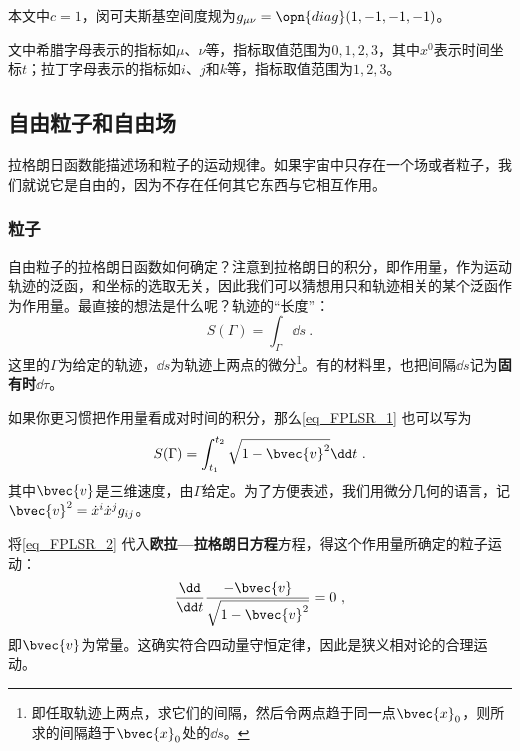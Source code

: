 

本文中$c=1$，闵可夫斯基空间度规为$g_{\mu\nu} = \opn{diag}(1, -1, -1, -1)$。

文中希腊字母表示的指标如$\mu$、$\nu$等，指标取值范围为$0, 1, 2, 3$，其中$x^0$表示时间坐标$t$；拉丁字母表示的指标如$i$、$j$和$k$等，指标取值范围为$1, 2, 3$。

\subsection{自由粒子和自由场}

拉格朗日函数能描述场和粒子的运动规律。如果宇宙中只存在一个场或者粒子，我们就说它是自由的，因为不存在任何其它东西与它相互作用。

\subsubsection{粒子}

自由粒子的拉格朗日函数如何确定？注意到拉格朗日的积分，即作用量，作为运动轨迹的泛函，和坐标的选取无关，因此我们可以猜想用只和轨迹相关的某个泛函作为作用量。最直接的想法是什么呢？轨迹的“长度”：
\begin{equation}\label{eq_FPLSR_1}
S(\Gamma) = \int_\Gamma \dd s~.
\end{equation}
这里的$\Gamma$为给定的轨迹，$\dd s$为轨迹上两点的微分\footnote{即任取轨迹上两点，求它们的间隔，然后令两点趋于同一点$\bvec{x}_0$，则所求的间隔趋于$\bvec{x}_0$处的$\dd s$。}。有的材料里，也把间隔$\dd s$记为\textbf{固有时}$\dd \tau$。

如果你更习惯把作用量看成对时间的积分，那么\autoref{eq_FPLSR_1} 也可以写为
\begin{equation}\label{eq_FPLSR_2}
S(\Gamma) = \int_{t_1}^{t_2} \sqrt{1-\bvec{v}^2} \dd t~.
\end{equation}
其中$\bvec{v}$是三维速度，由$\Gamma$给定。为了方便表述，我们用微分几何的语言，记$\bvec{v}^2=\dot{x}^i\dot{x}^jg_{ij}$。

将\autoref{eq_FPLSR_2} 代入\textbf{欧拉—拉格朗日方程}方程，得这个作用量所确定的粒子运动：
\begin{equation}
\frac{\dd}{\dd t}\frac{-\bvec{v}}{\sqrt{1-\bvec{v}^2}} = 0~,
\end{equation}
即$\bvec{v}$为常量。这确实符合四动量守恒定律，因此是狭义相对论的合理运动。

